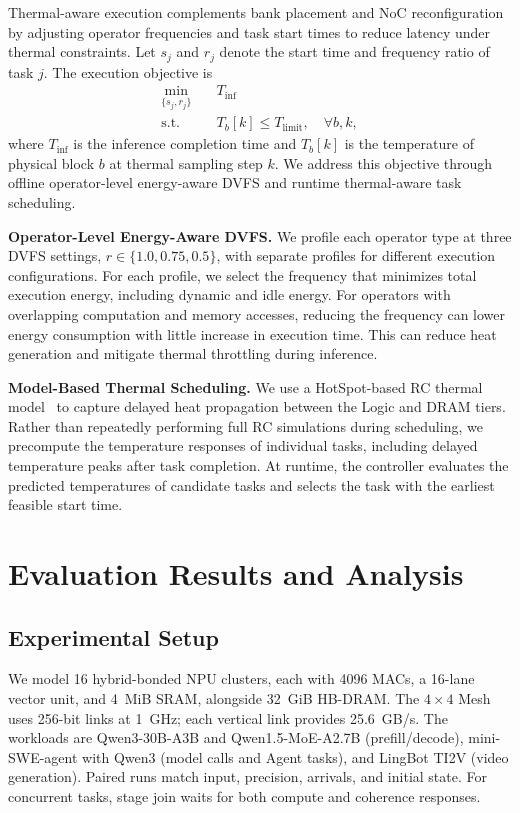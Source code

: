 \documentclass[conference,10pt]{IEEEtran}
\begin{document}
Thermal-aware execution complements bank placement and
NoC reconfiguration by adjusting operator frequencies and
task start times to reduce latency under thermal constraints.
Let $s_j$ and $r_j$ denote the start time and frequency
ratio of task $j$. The execution objective is
\begin{equation}
\begin{aligned}
  \min_{\{s_j,r_j\}} \quad & T_{\mathrm{inf}} \\
  \mathrm{s.t.}\quad
  & T_b[k]\leq T_{\mathrm{limit}},\quad \forall b,k,
\end{aligned}
\label{eq:thermal-optimization}
\end{equation}
where $T_{\mathrm{inf}}$ is the inference completion time
and $T_b[k]$ is the temperature of physical block $b$ at
thermal sampling step $k$.
We address this objective through offline operator-level
energy-aware DVFS and runtime thermal-aware task scheduling.


\noindent\textbf{Operator-Level Energy-Aware DVFS.}
We profile each operator type at three DVFS settings, $r\in\{1.0,0.75,0.5\}$, with separate profiles for different execution configurations. For each profile, we select the frequency that minimizes total execution energy, including dynamic and idle energy. For operators with overlapping computation and memory accesses, reducing the frequency can lower energy consumption with little increase in execution time. This can reduce heat generation and mitigate thermal throttling during inference.

\noindent\textbf{Model-Based Thermal Scheduling.}
We use a HotSpot-based RC thermal model~\cite{hotspot_tool} to capture delayed heat propagation between the Logic and DRAM tiers. Rather than repeatedly performing full RC simulations during scheduling, we precompute the temperature responses of individual tasks, including delayed temperature peaks after task completion. At runtime, the controller evaluates the predicted temperatures of candidate tasks and selects the task with the earliest feasible start time.

\FloatBarrier

\section{Evaluation Results and Analysis}
\label{sec:experiment}

\subsection{Experimental Setup}
We model 16 hybrid-bonded NPU clusters, each with 4096 MACs, a 16-lane
vector unit, and 4~MiB SRAM, alongside 32~GiB HB-DRAM. The $4\times4$
Mesh uses 256-bit links at 1~GHz; each vertical link provides 25.6~GB/s.
The workloads are Qwen3-30B-A3B and Qwen1.5-MoE-A2.7B (prefill/decode),
mini-SWE-agent with Qwen3 (model calls and Agent tasks), and LingBot TI2V
(video generation). Paired runs match input, precision, arrivals, and
initial state. For concurrent tasks, stage join waits for both compute
and coherence responses.
\end{document}
